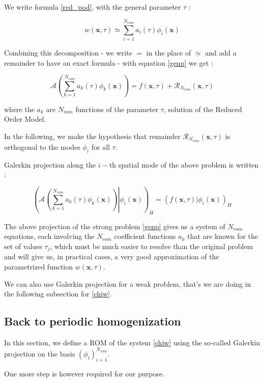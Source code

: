 We write formula \ref{red_pod}, with the general parameter $\tau$ :

\begin{equation}
w(\mathbf{x},\tau)\simeq\sum\limits_{i=1}^{N_{rom}} a_i(\tau)\phi_i(\mathbf{x})
\end{equation}

Combining this decomposition - we write $=$ in the place of $\simeq$ and add a remainder to have an exact formula - with equation \ref{genp} we get :

\[%
\mathcal{A}\left(\sum\limits_{k=1}^{N_{rom}} a_k(\tau)\phi_k(\mathbf{x})\right) %
= f\left(\mathbf{x},\tau\right) + \mathcal{R}_{N_{rom}}(\mathbf{x},\tau)%
\]

where the $a_k$ are $N_{rom}$ functions of the parameter $\tau$, solution of the Reduced Order Model.

\etoile
In the following, we make the hypothesis that remainder $\mathcal{R}_{N_{rom}}(\mathbf{x},\tau)$ is orthogonal to the modes $\phi_i$ for all $\tau$.

\par
Galerkin projection along the $i-$th spatial mode of the above problem is written :

\[%
\left(\left.\mathcal{A}\left(\sum\limits_{k=1}^{N_{rom}} a_k(\tau)\phi_k(\mathbf{x})\right) \right|\phi_i\left(\mathbf{x}\right)\right)_H %
= \left(f\left(\mathbf{x},\tau\right)|\phi_i(\mathbf{x})\right)_H%
\]

\par
The above projection of the strong problem \ref{genp} gives us a system of $N_{rom}$ equations, each involving the $N_{rom}$ coefficient functions $a_k$ %
that are known for the set of values $\tau_j$, which must be much easier to resolve than the original problem and will give us, %
in practical cases, a very good approximation of the parametrized function $w(\mathbf{x},\tau)$.

\etoile
We can also use Galerkin projection for a weak problem, that's we are doing in the following subsection for \ref{chiw}.

\subsection{Back to periodic homogenization}\label{pod_rom}

In this section, we define a ROM of the system \ref{chiw} using the so-called Galerkin projection on the basis $(\phi_i)_{i=1}^{N_{rom}}$.

One more step is however required for our purpose.

